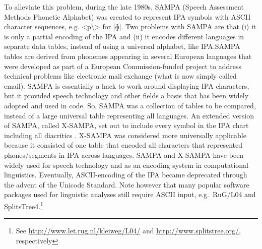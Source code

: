 To alleviate this problem, during the late 1980s, SAMPA (Speech Assessment
Methods Phonetic Alphabet) was created to represent IPA symbols with ASCII
character sequences, e.g. <p\textbackslash> for [ɸ]. Two problems with SAMPA are
that (i) it is only a partial encoding of the IPA and (ii) it encodes different
languages in separate data tables, instead of using a universal alphabet, like
IPA.\@ SAMPA tables are derived from phonemes appearing in several European
languages that were developed as part of a European Commission-funded project to
address technical problems like electronic mail exchange (what is now simply
called email). SAMPA is essentially a hack to work around displaying IPA
characters, but it provided speech technology and other fields a basis that has
been widely adopted and used in code. So, SAMPA was a collection of tables to be
compared, instead of a large universal table representing all languages. An
extended version of SAMPA, called X-SAMPA, set out to include every symbol in
the IPA chart including all diacritics \citep{WellsND}. X-SAMPA was considered
more universally applicable because it consisted of one table that encoded all
characters that represented phones/segments in IPA across languages. SAMPA and
X-SAMPA have been widely used for speech technology and as an encoding system in
computational linguistics. Eventually, ASCII-encoding of the IPA became
deprecated through the advent of the Unicode Standard. Note however that many
popular software packages used for linguistic analyses still require ASCII
input, e.g.~RuG/L04 and SplitsTree4.\footnote{See
\url{http://www.let.rug.nl/kleiweg/L04/} and \url{http://www.splitstree.org/},
respectively}

